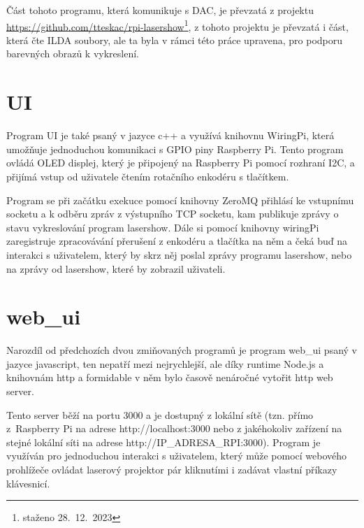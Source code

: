 \documentclass{template/socthesis}
\begin{document}
Část tohoto programu, která komunikuje s DAC, je převzatá z projektu \url{https://github.com/tteskac/rpi-lasershow}\footnote{staženo 28.~12.~2023}, z tohoto projektu je převzatá i část, která čte ILDA soubory, ale ta byla v rámci této práce upravena, pro podporu barevných obrazů k vykreslení.






\section{UI}

Program UI je také psaný v jazyce c++ a využívá knihovnu WiringPi, která umožňuje jednoduchou komunikaci s GPIO piny Raspberry Pi. Tento program ovládá OLED displej, který je připojený na Raspberry Pi pomocí rozhraní I2C, a přijímá vstup od uživatele čtením rotačního enkodéru s tlačítkem.

Program se při začátku exekuce pomocí knihovny ZeroMQ přihlásí ke vstupnímu socketu a k odběru zpráv z výstupního TCP socketu, kam publikuje zprávy o stavu vykreslování program lasershow. Dále si pomocí knihovny wiringPi zaregistruje zpracovávání přerušení z enkodéru a tlačítka na něm a čeká buď na interakci s uživatelem, který by skrz něj poslal zprávy programu lasershow, nebo na zprávy od lasershow, které by zobrazil uživateli.


\section{web\_ui}

Narozdíl od předchozích dvou zmiňovaných programů je program web\_ui psaný v jazyce javascript, ten nepatří mezi nejrychlejší, ale díky runtime Node.js a knihovnám http a formidable v něm bylo časově nenáročné vytořit http web server.

Tento server běží na portu 3000 a je dostupný z lokální sítě (tzn. přímo z\ Raspberry Pi na adrese http://localhost:3000 nebo z jakéhokoliv zařízení na stejné lokální síti na adrese http://IP\_ADRESA\_RPI:3000).
Program je využíván pro jednoduchou interakci s uživatelem, který může pomocí webového prohlížeče ovládat laserový projektor pár kliknutími i zadávat vlastní příkazy klávesnicí.
\end{document}
